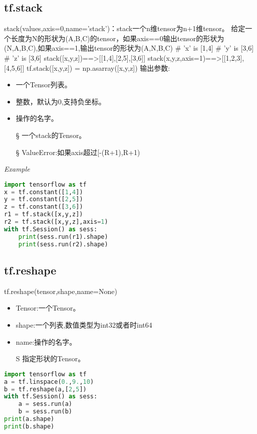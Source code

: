 \subsection{tf.stack}
stack(values,axis=0,name='stack')：stack一个n维tensor为n+1维tensor。
给定一个长度为N的形状为(A,B,C)的tensor，如果axis==0输出tensor的形状为(N,A,B,C),如果axis==1,输出tensor的形状为(A,N,B,C)
\# 'x' is [1,4]\newline
\# 'y' is [3,6]\newline
\# 'z' is [3,6]\newline
stack([x,y,z])==>[[1,4],[2,5],[3,6]]\newline
stack(x,y,z,axis=1)==>[[1,2,3],[4,5,6]]\newline
tf.stack([x,y,z]) = np.asarray([x,y,z])\newline
输出参数:
\begin{itemize}
	\item 一个Tensor列表。
	\item 整数，默认为0,支持负坐标。
	\item 操作的名字。
	\item[\S] 一个stack的Tensor。
	\item[\S] ValueError:如果axis超过[-(R+1),R+1)
\end{itemize}
\textsl{Example}
\begin{lstlisting}[language=Python]
import tensorflow as tf
x = tf.constant([1,4])
y = tf.constant([2,5])
z = tf.constant([3,6])
r1 = tf.stack([x,y,z])
r2 = tf.stack([x,y,z],axis=1)
with tf.Session() as sess:
    print(sess.run(r1).shape)
    print(sess.run(r2).shape)
\end{lstlisting}
\subsection{tf.reshape}
tf.reshape(tensor,shape,name=None)
\begin{itemize}
	\item Tensor:一个Tensor。
	\item shape:一个列表,数值类型为int32或者时int64
	\item name:操作的名字。
	\item[S] 指定形状的Tensor。
\end{itemize}
\begin{lstlisting}[language=Python]
import tensorflow as tf
a = tf.linspace(0.,9.,10)
b = tf.reshape(a,[2,5])
with tf.Session() as sess:
    a = sess.run(a)
    b = sess.run(b)
print(a.shape)
print(b.shape)
\end{lstlisting}
